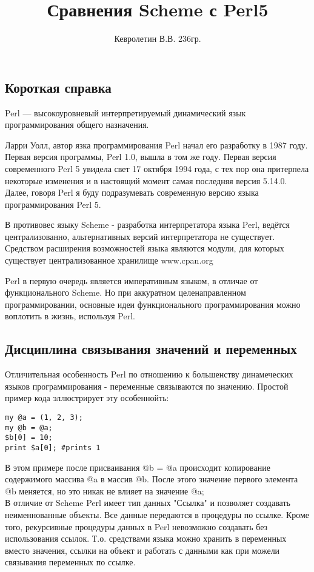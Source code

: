 \documentclass[11pt,a4paper]{article}
\author{Кевролетин В.В. 236гр.}
\title{Сравнения Scheme с Perl5}
\begin{document}
\maketitle

\subsection*{Короткая справка}

Perl — высокоуровневый интерпретируемый динамический язык
программирования общего назначения. 

Ларри Уолл, автор язка программирования Perl начал его разработку в
1987 году. Первая версия программы, Perl 1.0, вышла в том же году.
Первая версия современного Perl 5 увидела свет 17 октября 1994 года, с
тех пор она притерпела некоторые изменения и в настоящий момент самая
последняя версия 5.14.0. \\
Далее, говоря Perl я буду подразумевать современную версию языка
программирования Perl 5.

В противовес языку Scheme - разработка интерпретатора языка Perl,
ведётся централизованно, альтернативных версий интерпретатора не
существует. Средством расширения возможностей языка являются модули,
для которых существует централизованное хранилище www.cpan.org

Perl в первую очередь является императивным языком, в отличае от
функционального Scheme. Но при аккуратном целенаправленном
программировании, основные идеи функционального 
программирования  можно воплотить в жизнь, используя Perl.


\subsection*{Дисциплина связывания значений и переменных}
Отличительная особенность Perl по отношению к большенству динамеческих
языков программирования - переменные связываются по значению. Простой
пример кода эллюстрирует эту особеннойть:
\begin{lstlisting}
my @a = (1, 2, 3);
my @b = @a;
$b[0] = 10;
print $a[0]; #prints 1
\end{lstlisting}
В этом примере после присваивания @b = @a происходит копирование
содержимого массива 
@a в массив @b. После этого значение первого элемента @b меняется,  но
это никак не влияет на значение @a; \\
В отличие от Scheme Perl имеет тип данных "Ссылка" и позволяет
создавать неименнованные объекты. Все данные передаются в
процедуры по ссылке. Кроме того, рекурсивные процедуры данных в Perl
невозможно создавать без использования ссылок. Т.о. средствами языка
можно хранить в переменных вместо значения, ссылки на объект и
работать с данными как при можели связывания переменных по ссылке. 
\end{document}
